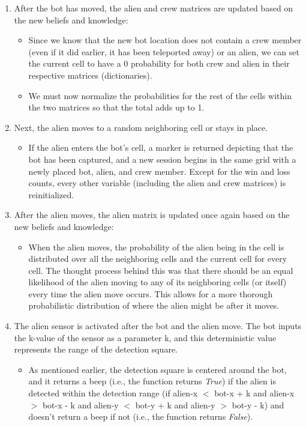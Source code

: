 \documentclass[11pt]{article}
\begin{document}
\begin{enumerate}
\begin{itemize}
    \end{itemize}
    \item After the bot has moved, the alien and crew matrices are updated based on the new beliefs and knowledge:
    \begin{itemize}
        \item Since we know that the new bot location does not contain a crew member (even if it did earlier, it has been teleported away) or an alien, we can set the current cell to have a 0 probability for both crew and alien in their respective matrices (dictionaries).
        \item We must now normalize the probabilities for the rest of the cells within the two matrices so that the total adds up to 1.
    \end{itemize}
    \item Next, the alien moves to a random neighboring cell or stays in place.
    \begin{itemize}
        \item If the alien enters the bot's cell, a marker is returned depicting that the bot has been captured, and a new session begins in the same grid with a newly placed bot, alien, and crew member. Except for the win and loss counts, every other variable (including the alien and crew matrices) is reinitialized.
    \end{itemize}
    \item After the alien moves, the alien matrix is updated once again based on the new beliefs and knowledge:
    \begin{itemize}
        \item When the alien moves, the probability of the alien being in the cell is distributed over all the neighboring cells and the current cell for every cell. The thought process behind this was that there should be an equal likelihood of the alien moving to any of its neighboring cells (or itself) every time the alien move occurs. This allows for a more thorough probabilistic distribution of where the alien might be after it moves.
    \end{itemize}
    \item The alien sensor is activated after the bot and the alien move. The bot inputs the k-value of the sensor as a parameter k, and this deterministic value represents the range of the detection square. 
    \begin{itemize}
        \item As mentioned earlier, the detection square is centered around the bot, and it returns a beep (i.e., the function returns \emph{True}) if the alien is detected within the detection range (if alien-x $<$ bot-x + k and alien-x $>$ bot-x - k and alien-y $<$ bot-y + k and alien-y $>$ bot-y - k) and doesn't return a beep if not (i.e., the function returns \emph{False}). 

\end{itemize}
\end{enumerate}
\end{document}
